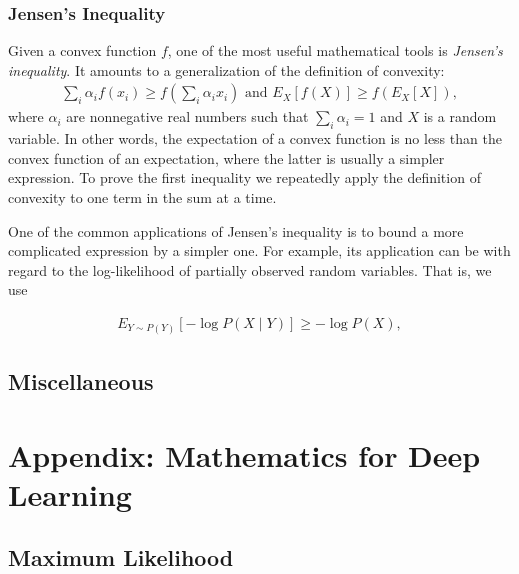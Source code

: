 \documentclass[a4paper,12pt]{article}
\theoremstyle{definition}
\begin{document}
\subsubsection*{Jensen's Inequality}
Given a convex function $f$, one of the most useful mathematical tools is \emph{Jensen's inequality}. It amounts to a generalization of the definition of convexity:
\begin{equation*}
    \begin{aligned}
        \sum_i \alpha_i f(x_i)  \geq f\left(\sum_i \alpha_i x_i\right)    \text{ and }    E_X[f(X)]  \geq f\left(E_X[X]\right),
    \end{aligned}
\end{equation*}
where $\alpha_i$ are nonnegative real numbers such that $\sum_i \alpha_i = 1$ and $X$ is 
a random variable. In other words, the expectation of a convex function is no less than 
the convex function of an expectation, where the latter is usually a simpler expression. 
To prove the first inequality we repeatedly apply the definition of convexity to one term 
in the sum at a time.

One of the common applications of Jensen's inequality is to bound a more complicated 
expression by a simpler one. For example, its application can be with regard to the 
log-likelihood of partially observed random variables. That is, we use

\begin{equation*}
    \begin{aligned}
        E_{Y \sim P(Y)}[-\log P(X \mid Y)] \geq -\log P(X),
    \end{aligned}
\end{equation*}








\newpage
\subsection*{Miscellaneous}


\section{Appendix: Mathematics for Deep Learning}
\subsection{Maximum Likelihood}
\end{document}
